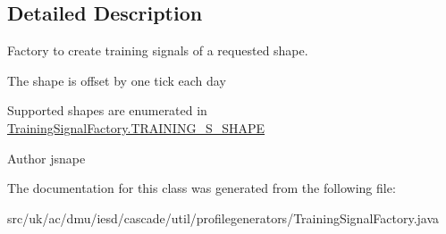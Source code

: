 \subsection{Detailed Description}
Factory to create training signals of a requested shape. 

The shape is offset by one tick each day

Supported shapes are enumerated in \hyperlink{}{Training\-Signal\-Factory.\-T\-R\-A\-I\-N\-I\-N\-G\-\_\-\-S\-\_\-\-S\-H\-A\-P\-E}

\begin{DoxyAuthor}{Author}
jsnape 
\end{DoxyAuthor}


The documentation for this class was generated from the following file\-:\begin{DoxyCompactItemize}
\item 
src/uk/ac/dmu/iesd/cascade/util/profilegenerators/Training\-Signal\-Factory.\-java\end{DoxyCompactItemize}

